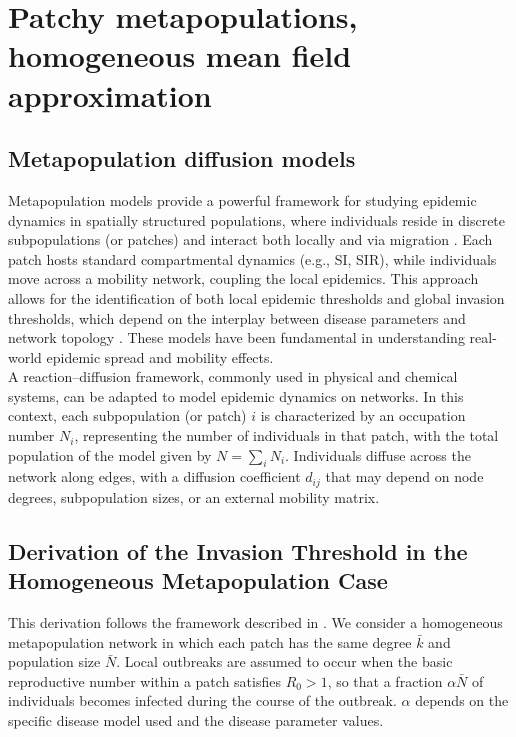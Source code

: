 \chapter{Patchy metapopulations, homogeneous mean field approximation}



\section{Metapopulation diffusion models}
 
Metapopulation models provide a powerful framework for studying epidemic dynamics in spatially structured populations, where individuals reside in discrete subpopulations (or patches) and interact both locally and via migration \cite{colizza2007invasion,vespignani2008}. Each patch hosts standard compartmental dynamics (e.g., SI, SIR), while individuals move across a mobility network, coupling the local epidemics. This approach allows for the identification of both local epidemic thresholds and global invasion thresholds, which depend on the interplay between disease parameters and network topology \cite{ball1997}. These models have been fundamental in understanding real-world epidemic spread and mobility effects. \\
A reaction--diffusion framework, commonly used in physical and chemical systems, can be adapted to model epidemic dynamics on networks. In this context, each subpopulation (or patch) $i$ is characterized by an occupation number $N_i$, representing the number of individuals in that patch, with the total population of the model given by $N = \sum_i N_i$. Individuals diffuse across the network along edges, with a diffusion coefficient $d_{ij}$ that may depend on node degrees, subpopulation sizes, or an external mobility matrix.


\section{Derivation of the Invasion Threshold in the Homogeneous Metapopulation Case}

This derivation follows the framework described in \cite{colizza2007invasion}.
We consider a homogeneous metapopulation network in which each patch has the same degree \(\bar{k}\) and population size \(\bar{N}\). Local outbreaks are assumed to occur when the basic reproductive number within a patch satisfies \(R_0 > 1\), so that a fraction \(\alpha\bar{N}\) of individuals becomes infected during the course of the outbreak. $\alpha$ depends on the specific disease model used and the disease parameter values.

